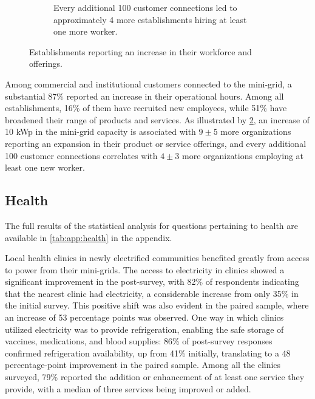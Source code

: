 \begin{figure}[th]
\begin{subfigure}[t]{0.48\textwidth}
        \caption{Every additional 100 customer connections led to approximately 4 more establishments hiring at least one more worker.}
        \label{fig:workforce_change}
    \end{subfigure}
    \caption{Establishments reporting an increase in their workforce and offerings.}
    \label{fig:ci_productivity}
\end{figure}

Among commercial and institutional customers connected to the mini-grid, a substantial 87\% reported an increase in their operational hours. Among all establishments, 16\% of them have recruited new employees, while 51\% have broadened their range of products and services. As illustrated by \cref{fig:ci_productivity}, an increase of 10 kWp in the mini-grid capacity is associated with $9\pm5$ more organizations reporting an expansion in their product or service offerings, and every additional 100 customer connections correlates with $4\pm3$ more organizations employing at least one new worker. 

\subsection{Health}
The full results of the statistical analysis for questions pertaining to health are available in \cref{tab:app:health} in the appendix.

Local health clinics in newly electrified communities benefited greatly from access to power from their mini-grids. The access to electricity in clinics showed a significant improvement in the post-survey, with 82\% of respondents indicating that the nearest clinic had electricity, a considerable increase from only 35\% in the initial survey. This positive shift was also evident in the paired sample, where an increase of 53 percentage points was observed. One way in which clinics utilized electricity was to provide refrigeration, enabling the safe storage of vaccines, medications, and blood supplies: 86\% of post-survey responses confirmed refrigeration availability, up from 41\% initially, translating to a 48 percentage-point improvement in the paired sample. Among all the clinics surveyed, 79\% reported the addition or enhancement of at least one service they provide, with a median of three services being improved or added.

